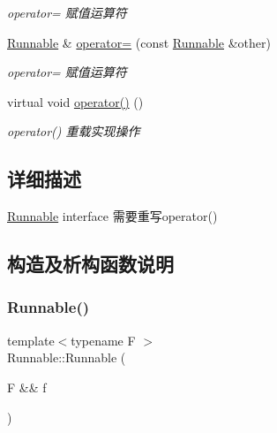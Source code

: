 \begin{DoxyCompactItemize}
\begin{DoxyCompactList}\small\item\em operator= 赋值运算符 \end{DoxyCompactList}\item 
\hyperlink{classRunnable}{Runnable} \& \hyperlink{classRunnable_aac70062e7bc1f55cc1695fa37d75df53}{operator=} (const \hyperlink{classRunnable}{Runnable} \&other)
\begin{DoxyCompactList}\small\item\em operator= 赋值运算符 \end{DoxyCompactList}\item 
\mbox{\label{classRunnable_a38bf849dab4bbb86fc5bc6e7aff383e0}} 
virtual void \hyperlink{classRunnable_a38bf849dab4bbb86fc5bc6e7aff383e0}{operator()} ()
\begin{DoxyCompactList}\small\item\em operator() 重载实现操作 \end{DoxyCompactList}\end{DoxyCompactItemize}


\subsection{详细描述}
\hyperlink{classRunnable}{Runnable} interface 需要重写operator() 

\subsection{构造及析构函数说明}
\mbox{\label{classRunnable_ab052afa8b53dd1e7c28e978962839446}} 
\subsubsection{\texorpdfstring{Runnable()}{Runnable()}\hspace{0.1cm}{\footnotesize\ttfamily [1/4]}}
{\footnotesize\ttfamily template$<$typename F $>$ \\
Runnable\+::\+Runnable (\begin{DoxyParamCaption}\item[{F \&\&}]{f }\end{DoxyParamCaption})\hspace{0.3cm}{\ttfamily [inline]}}



